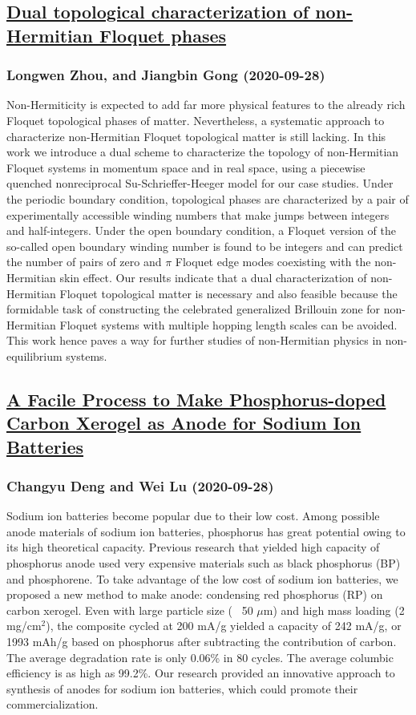 \subsection*{\href{http://arxiv.org/abs/2009.13078v1}{Dual topological characterization of non-Hermitian Floquet phases}}
\subsubsection*{Longwen Zhou, and Jiangbin Gong (2020-09-28)}
Non-Hermiticity is expected to add far more physical features to the already
rich Floquet topological phases of matter. Nevertheless, a systematic approach
to characterize non-Hermitian Floquet topological matter is still lacking. In
this work we introduce a dual scheme to characterize the topology of
non-Hermitian Floquet systems in momentum space and in real space, using a
piecewise quenched nonreciprocal Su-Schrieffer-Heeger model for our case
studies. Under the periodic boundary condition, topological phases are
characterized by a pair of experimentally accessible winding numbers that make
jumps between integers and half-integers. Under the open boundary condition, a
Floquet version of the so-called open boundary winding number is found to be
integers and can predict the number of pairs of zero and $\pi$ Floquet edge
modes coexisting with the non-Hermitian skin effect. Our results indicate that
a dual characterization of non-Hermitian Floquet topological matter is
necessary and also feasible because the formidable task of constructing the
celebrated generalized Brillouin zone for non-Hermitian Floquet systems with
multiple hopping length scales can be avoided. This work hence paves a way for
further studies of non-Hermitian physics in non-equilibrium systems.

\subsection*{\href{http://arxiv.org/abs/2009.13056v1}{A Facile Process to Make Phosphorus-doped Carbon Xerogel as Anode for  Sodium Ion Batteries}}
\subsubsection*{Changyu Deng and Wei Lu (2020-09-28)}
Sodium ion batteries become popular due to their low cost. Among possible
anode materials of sodium ion batteries, phosphorus has great potential owing
to its high theoretical capacity. Previous research that yielded high capacity
of phosphorus anode used very expensive materials such as black phosphorus (BP)
and phosphorene. To take advantage of the low cost of sodium ion batteries, we
proposed a new method to make anode: condensing red phosphorus (RP) on carbon
xerogel. Even with large particle size (~ 50 $\mu$m) and high mass loading (2
mg/cm$^2$), the composite cycled at 200 mA/g yielded a capacity of 242 mA/g, or
1993 mAh/g based on phosphorus after subtracting the contribution of carbon.
The average degradation rate is only 0.06\% in 80 cycles. The average columbic
efficiency is as high as 99.2\%. Our research provided an innovative approach to
synthesis of anodes for sodium ion batteries, which could promote their
commercialization.

